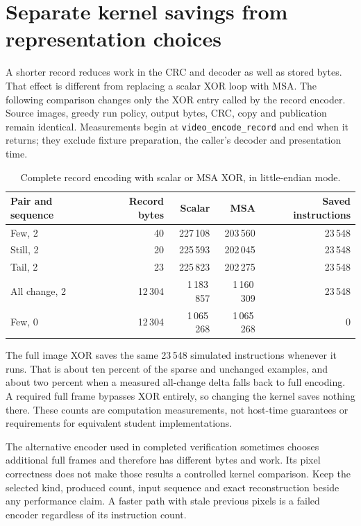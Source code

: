 \section{Separate kernel savings from representation choices}
A shorter record reduces work in the CRC and decoder as well as stored bytes.
That effect is different from replacing a scalar XOR loop with MSA. The following
comparison changes only the XOR entry called by the record encoder. Source images,
greedy run policy, output bytes, CRC, copy and publication remain identical.
Measurements begin at \texttt{video\_encode\_record} and end when it returns;
they exclude fixture preparation, the caller's decoder and presentation time.

\begin{table}[htbp]
  \centering
  \caption{Complete record encoding with scalar or MSA XOR, in little-endian mode.}
  \label{tab:video-delta-encode-work}
  \begin{tabular}{l r r r r}
    \toprule
    Pair and sequence & Record bytes & Scalar      & MSA         & Saved instructions \\
    \midrule
    Few, 2            & 40           & 227\,108    & 203\,560    & 23\,548            \\
    Still, 2          & 20           & 225\,593    & 202\,045    & 23\,548            \\
    Tail, 2           & 23           & 225\,823    & 202\,275    & 23\,548            \\
    All change, 2     & 12\,304      & 1\,183\,857 & 1\,160\,309 & 23\,548            \\
    Few, 0            & 12\,304      & 1\,065\,268 & 1\,065\,268 & 0                  \\
    \bottomrule
  \end{tabular}
\end{table}

The full image XOR saves the same 23\,548 simulated instructions whenever it runs.
That is about ten percent of the sparse and unchanged examples, and about two
percent when a measured all-change delta falls back to full encoding. A required
full frame bypasses XOR entirely, so changing the kernel saves nothing there.
These counts are computation measurements, not host-time guarantees or requirements
for equivalent student implementations.

The alternative encoder used in completed verification sometimes chooses additional
full frames and therefore has different bytes and work. Its pixel correctness does
not make those results a controlled kernel comparison. Keep the selected kind,
produced count, input sequence and exact reconstruction beside any performance
claim. A faster path with stale previous pixels is a failed encoder regardless of
its instruction count.

